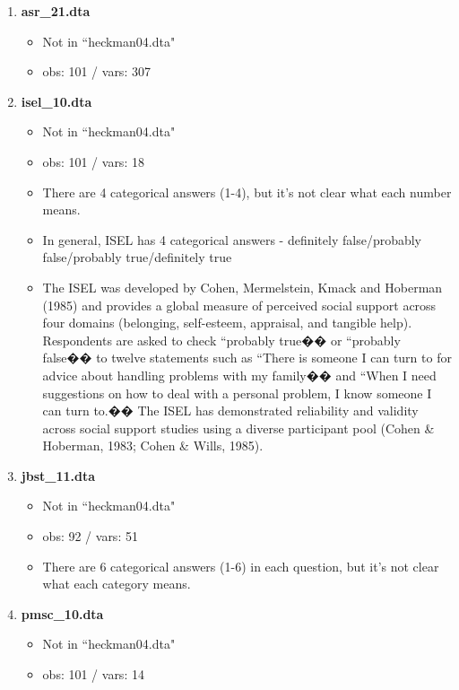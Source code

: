 \documentclass[11pt]{article}
\begin{document}
\begin{enumerate}
    \item {\bf asr\_21.dta}
    \begin{itemize}
        \item Not in ``heckman04.dta"
        \item obs: 101 / vars: 307\\
    \end{itemize}
    \item {\bf isel\_10.dta}
    \begin{itemize}
        \item Not in ``heckman04.dta"
        \item obs: 101 / vars: 18
        \item There are 4 categorical answers (1-4), but it's not clear what each number means.
        \item In general, ISEL has 4 categorical answers - definitely false/probably false/probably true/definitely true
        \item The ISEL was developed by Cohen, Mermelstein, Kmack and Hoberman (1985) and provides a global measure of perceived social support across four domains (belonging, self-esteem, appraisal, and tangible help). Respondents are asked to check ``probably true�� or ``probably false�� to twelve statements such as ``There is someone I can turn to for advice about handling problems with my family�� and ``When I need suggestions on how to deal with a personal problem, I know someone I can turn to.�� The ISEL has demonstrated reliability and validity across social support studies using a diverse participant pool (Cohen \& Hoberman, 1983; Cohen \& Wills, 1985).\\
    \end{itemize}
    \item {\bf jbst\_11.dta}
    \begin{itemize}
        \item Not in ``heckman04.dta"
        \item obs: 92 / vars: 51
        \item There are 6 categorical answers (1-6) in each question, but it's not clear what each category means.\\
    \end{itemize}
    \item {\bf pmsc\_10.dta}
    \begin{itemize}
        \item Not in ``heckman04.dta"
        \item obs: 101 / vars: 14

\end{itemize}
\end{enumerate}
\end{document}
